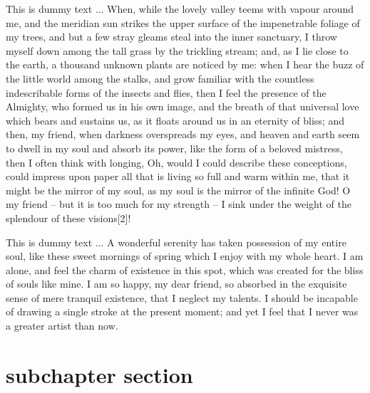 \documentclass[letterpaper,oneside,11pt]{book}
\begin{document}
This is dummy text ... When, while the lovely valley teems with vapour around me, and the meridian sun strikes the upper surface of the impenetrable foliage of my trees, and but a few stray gleams steal into the inner sanctuary, I throw myself down among the tall grass by the trickling stream; and, as I lie close to the earth, a thousand unknown plants are noticed by me: when I hear the buzz of the little world among the stalks, and grow familiar with the countless indescribable forms of the insects and flies, then I feel the presence of the Almighty, who formed us in his own image, and the breath of that universal love which bears and sustains us, as it floats around us in an eternity of bliss; and then, my friend, when darkness overspreads my eyes, and heaven and earth seem to dwell in my soul and absorb its power, like the form of a beloved mistress, then I often think with longing, Oh, would I could describe these conceptions, could impress upon paper all that is living so full and warm within me, that it might be the mirror of my soul, as my soul is the mirror of the infinite God! O my friend -- but it is too much for my strength -- I sink under the weight of the splendour of these visions[2]!



This is dummy text ... A wonderful serenity has taken possession of my entire soul, like these sweet mornings of spring which I enjoy with my whole heart. I am alone, and feel the charm of existence in this spot, which was created for the bliss of souls like mine. I am so happy, my dear friend, so absorbed in the exquisite sense of mere tranquil existence, that I neglect my talents. I should be incapable of drawing a single stroke at the present moment; and yet I feel that I never was a greater artist than now.


\section{subchapter section}\label{subchapter-section-3}
\end{document}
